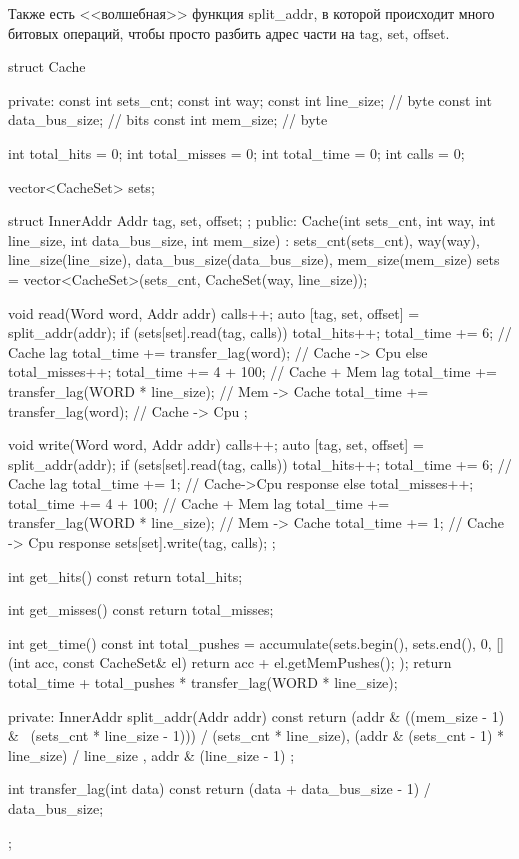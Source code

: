 \documentclass[14pt, russian, onesize]{extreport}
\begin{document}
Также есть <<волшебная>> функция split\_addr,
в которой происходит много битовых операций, чтобы просто 
разбить адрес части на tag, set, offset.
\begin{cppcode}
struct Cache { 
private:
    const int sets_cnt;
    const int way;
    const int line_size;        // byte
    const int data_bus_size;    // bits
    const int mem_size;         // byte

    int total_hits = 0;
    int total_misses = 0;
    int total_time = 0;
    int calls = 0;

    vector<CacheSet> sets;

    struct InnerAddr {
        Addr tag, set, offset;
    };
public:
    Cache(int sets_cnt, int way, int line_size, int data_bus_size, int mem_size) :
        sets_cnt(sets_cnt), way(way), line_size(line_size), data_bus_size(data_bus_size), mem_size(mem_size) {
        sets = vector<CacheSet>(sets_cnt, CacheSet(way, line_size));
    }

    void read(Word word, Addr addr) {
        calls++;
        auto [tag, set, offset] = split_addr(addr); 
        if (sets[set].read(tag, calls)) {
            total_hits++;
            total_time += 6; // Cache lag
            total_time += transfer_lag(word); // Cache -> Cpu
        } else {
            total_misses++;
            total_time += 4 + 100; // Cache + Mem lag
            total_time += transfer_lag(WORD * line_size); // Mem -> Cache
            total_time += transfer_lag(word); // Cache -> Cpu
        }
    };

    void write(Word word, Addr addr) {
        calls++;
        auto [tag, set, offset] = split_addr(addr); 
        if (sets[set].read(tag, calls)) {
            total_hits++;
            total_time += 6; // Cache lag 
            total_time += 1; // Cache->Cpu response
        } else {
            total_misses++;
            total_time += 4 + 100; // Cache + Mem lag
            total_time += transfer_lag(WORD * line_size); // Mem -> Cache
            total_time += 1;  // Cache -> Cpu response
        }
        sets[set].write(tag, calls);
    };

    int get_hits() const  {
        return total_hits;
    }

    int get_misses() const {
        return total_misses;
    }

    int get_time() const {
        int total_pushes = accumulate(sets.begin(), sets.end(), 0,
            [] (int acc, const CacheSet& el) {
                return acc + el.getMemPushes();
            }
        );
        return total_time + total_pushes * transfer_lag(WORD * line_size);
    }

private:
    InnerAddr split_addr(Addr addr) const {
        return {
            (addr & ((mem_size - 1) & ~(sets_cnt * line_size - 1))) / (sets_cnt * line_size),
            (addr & (sets_cnt - 1) * line_size) / line_size ,
            addr & (line_size - 1)
        };
    }

    int transfer_lag(int data) const {
        return (data + data_bus_size - 1) / data_bus_size;
    }

};
\end{cppcode}
\end{document}
